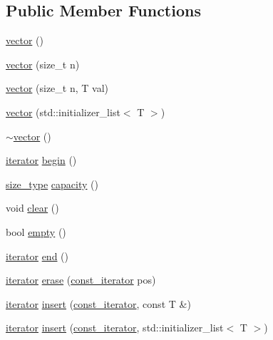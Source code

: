 \subsection*{Public Member Functions}
\begin{DoxyCompactItemize}
\item 
\mbox{\hyperlink{classvector_ad81d0c53b73688726d9e7da6fafe0383}{vector}} ()
\item 
\mbox{\hyperlink{classvector_a377696eeda0d3794f02d1ba5c340c3b6}{vector}} (size\+\_\+t n)
\item 
\mbox{\hyperlink{classvector_aba6394eef90c3c8c7ab07919f476bb48}{vector}} (size\+\_\+t n, T val)
\item 
\mbox{\hyperlink{classvector_acc1f450ecad1c00c720208371a6c9795}{vector}} (std\+::initializer\+\_\+list$<$ T $>$)
\item 
\mbox{\hyperlink{classvector_a886de2f986508b10e3792cd1e148eb7d}{$\sim$vector}} ()
\item 
\mbox{\hyperlink{classvector_a35c955cacac6aacaa1e82874b1628865}{iterator}} \mbox{\hyperlink{classvector_aab539612d29c3895d8d509f4b2bb83d5}{begin}} ()
\item 
\mbox{\hyperlink{classvector_ada51e68d31936547d3729c82daf6b7c6}{size\+\_\+type}} \mbox{\hyperlink{classvector_ae3d77c9f926f7ba0be3d154d0f7758d4}{capacity}} ()
\item 
void \mbox{\hyperlink{classvector_ac8bb3912a3ce86b15842e79d0b421204}{clear}} ()
\item 
bool \mbox{\hyperlink{classvector_a3f37b042a1e7cd4bd38fc564de81f0da}{empty}} ()
\item 
\mbox{\hyperlink{classvector_a35c955cacac6aacaa1e82874b1628865}{iterator}} \mbox{\hyperlink{classvector_a917b71a963fdd2726699c125a49c6864}{end}} ()
\item 
\mbox{\hyperlink{classvector_a35c955cacac6aacaa1e82874b1628865}{iterator}} \mbox{\hyperlink{classvector_a29790c28710ec0e64b48c2f4edd0b08c}{erase}} (\mbox{\hyperlink{classvector_a2fc97dce62b7053449cc868607540dba}{const\+\_\+iterator}} pos)
\item 
\mbox{\hyperlink{classvector_a35c955cacac6aacaa1e82874b1628865}{iterator}} \mbox{\hyperlink{classvector_abaccf57fd8aee4b5397e00e7cb4702c4}{insert}} (\mbox{\hyperlink{classvector_a2fc97dce62b7053449cc868607540dba}{const\+\_\+iterator}}, const T \&)
\item 
\mbox{\hyperlink{classvector_a35c955cacac6aacaa1e82874b1628865}{iterator}} \mbox{\hyperlink{classvector_a5e06aa6a068907bcf3ea202a6ae96c1c}{insert}} (\mbox{\hyperlink{classvector_a2fc97dce62b7053449cc868607540dba}{const\+\_\+iterator}}, std\+::initializer\+\_\+list$<$ T $>$)

\end{DoxyCompactItemize}
